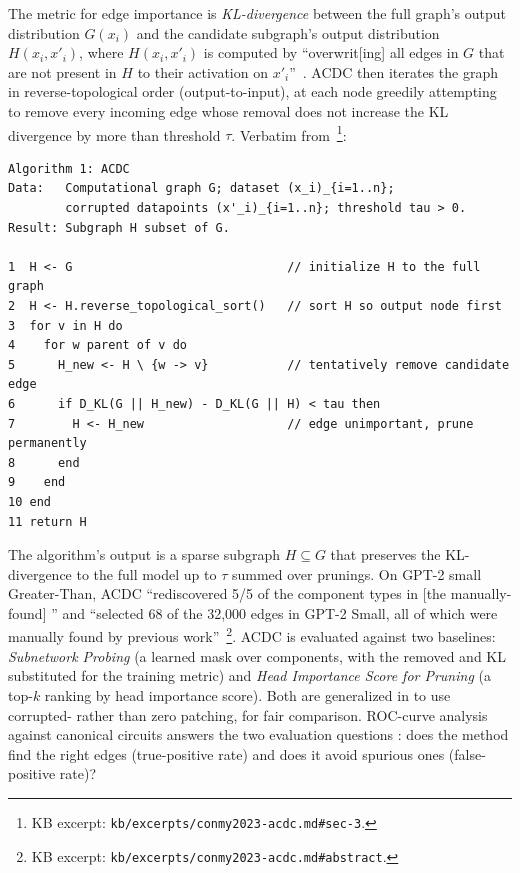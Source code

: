 The metric for edge importance is \emph{KL-divergence} between the full
graph's output distribution $G(x_i)$ and the candidate subgraph's
output distribution $H(x_i, x'_i)$, where $H(x_i, x'_i)$ is computed by
``overwrit[ing] all edges in $G$ that are not present in $H$ to their
activation on $x'_i$''~\citep[\S 3]{conmy2023-acdc}. ACDC then iterates
the graph in reverse-topological order (output-to-input), at each node
greedily attempting to remove every incoming edge whose removal does
not increase the KL divergence by more than threshold $\tau$. Verbatim
from~\citet[Algorithm 1]{conmy2023-acdc}\footnote{KB excerpt:
\nolinkurl{kb/excerpts/conmy2023-acdc.md#sec-3}.}:

\begin{lstlisting}[caption={ACDC, the Automatic Circuit DisCovery algorithm.},label={lst:acdc}]
Algorithm 1: ACDC
Data:   Computational graph G; dataset (x_i)_{i=1..n};
        corrupted datapoints (x'_i)_{i=1..n}; threshold tau > 0.
Result: Subgraph H subset of G.

1  H <- G                              // initialize H to the full graph
2  H <- H.reverse_topological_sort()   // sort H so output node first
3  for v in H do
4    for w parent of v do
5      H_new <- H \ {w -> v}           // tentatively remove candidate edge
6      if D_KL(G || H_new) - D_KL(G || H) < tau then
7        H <- H_new                    // edge unimportant, prune permanently
8      end
9    end
10 end
11 return H
\end{lstlisting}

The algorithm's output is a sparse subgraph $H \subseteq G$ that
preserves the KL-divergence to the full model up to $\tau$ summed over
prunings. On GPT-2 small Greater-Than, ACDC ``rediscovered 5/5 of the
component types in [the manually-found] '' and ``selected 68 of
the 32{,}000 edges in GPT-2 Small, all of which were manually found by
previous work''~\citep[Abstract]{conmy2023-acdc}\footnote{KB excerpt:
\nolinkurl{kb/excerpts/conmy2023-acdc.md#abstract}.}. ACDC is evaluated
against two baselines: \emph{Subnetwork Probing} (a learned mask over
components, with the  removed and KL substituted for the
training metric) and \emph{Head Importance Score for Pruning} (a
top-$k$ ranking by head importance score). Both are generalized in
\citet{conmy2023-acdc} to use corrupted- rather
than zero patching, for fair comparison. ROC-curve analysis against
canonical circuits answers the two evaluation questions
\citep[\S 4]{conmy2023-acdc}: does the method find the right edges
(true-positive rate) and does it avoid spurious ones (false-positive
rate)?

